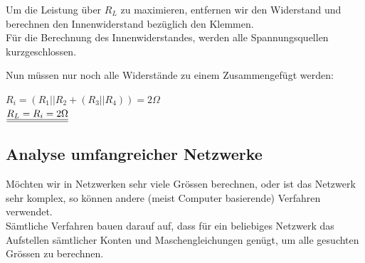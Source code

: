 \beginbsp
Um die Leistung über $R_L$ zu maximieren, entfernen wir den Widerstand und berechnen den Innenwiderstand bezüglich den Klemmen. \\
Für die Berechnung des Innenwiderstandes, werden alle Spannungsquellen kurzgeschlossen.
\begin{center}
\end{center}
Nun müssen nur noch alle Widerstände zu einem Zusammengefügt werden:
\begin{center}
	$R_i = (R_1 || R_2 + (R_3 || R_4 )) = 2 \Omega$ \\
	$\underline{\underline{ R_L = R_i = 2 \Omega}}$
\end{center}
\iend










										 \newpage





					          \subsection{Analyse umfangreicher Netzwerke}

					           Möchten wir in Netzwerken sehr viele Grössen berechnen, oder ist das Netzwerk sehr komplex, so können andere (meist Computer basierende) Verfahren verwendet. \\
					           Sämtliche Verfahren bauen darauf auf, dass für ein beliebiges Netzwerk das Aufstellen sämtlicher Konten und Maschengleichungen genügt, um alle gesuchten Grössen zu berechnen. \\

